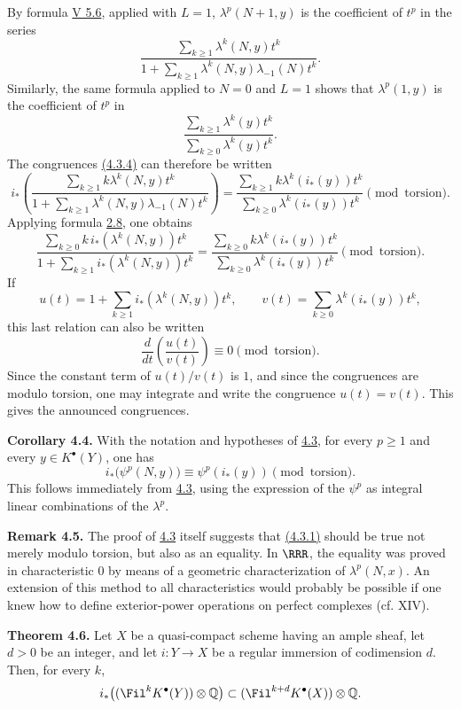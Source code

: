 By formula \hyperlink{sga6.e05.para.5-6}{V 5.6}, applied with \(L=1\), \(\lambda^p(N+1,y)\) is the coefficient of \(t^p\) in the series
\[
  \frac{\sum_{k\ge1}\lambda^k(N,y)t^k}
       {1+\sum_{k\ge1}\lambda^k(N,y)\lambda_{-1}(N)t^k}.
\]
Similarly, the same formula applied to \(N=0\) and \(L=1\) shows that \(\lambda^p(1,y)\) is the coefficient of \(t^p\) in
\[
  \frac{\sum_{k\ge1}\lambda^k(y)t^k}
       {\sum_{k\ge0}\lambda^k(y)t^k}.
\]
The congruences \hyperlink{sga6.e07.eq.4-3-4}{(4.3.4)} can therefore be written
\[
i_*\left(
  \frac{\sum_{k\ge1}k\lambda^k(N,y)t^k}
       {1+\sum_{k\ge1}\lambda^k(N,y)\lambda_{-1}(N)t^k}
\right)
=
  \frac{\sum_{k\ge1}k\lambda^k(i_*(y))t^k}
       {\sum_{k\ge0}\lambda^k(i_*(y))t^k}
       \pmod{\text{torsion}}.
\]
Applying formula \hyperlink{sga6.e07.cor.2-8}{2.8}, one obtains
\[
  \frac{\sum_{k\ge0}k\,i_*(\lambda^k(N,y))t^k}
       {1+\sum_{k\ge1} i_*(\lambda^k(N,y))t^k}
  =
  \frac{\sum_{k\ge0}k\lambda^k(i_*(y))t^k}
       {\sum_{k\ge0}\lambda^k(i_*(y))t^k}
       \pmod{\text{torsion}}.
\]
If
\[
  u(t)=1+\sum_{k\ge1}i_*(\lambda^k(N,y))t^k,\qquad
  v(t)=\sum_{k\ge0}\lambda^k(i_*(y))t^k,
\]
this last relation can also be written
\[
  \frac{d}{dt}\!\left(\frac{u(t)}{v(t)}\right)\equiv0
  \pmod{\text{torsion}}.
\]
Since the constant term of \(u(t)/v(t)\) is \(1\), and since the congruences are modulo torsion, one may integrate and write the congruence \(u(t)=v(t)\). This gives the announced congruences.

\textbf{Corollary 4.4.} With the notation and hypotheses of \hyperlink{sga6.e07.thm.4-3}{4.3}, for every \(p\ge1\) and every \(y\in K^\bullet(Y)\), one has
\[
  i_*\bigl(\psi^p(N,y)\bigr)\equiv \psi^p(i_*(y))
  \pmod{\text{torsion}}.
\]
This follows immediately from \hyperlink{sga6.e07.thm.4-3}{4.3}, using the expression of the \(\psi^p\) as integral linear combinations of the \(\lambda^p\).

\textbf{Remark 4.5.} The proof of \hyperlink{sga6.e07.thm.4-3}{4.3} itself suggests that \hyperlink{sga6.e07.eq.4-3-1}{(4.3.1)} should be true not merely modulo torsion, but also as an equality. In \(\RRR\), the equality was proved in characteristic \(0\) by means of a geometric characterization of \(\lambda^p(N,x)\). An extension of this method to all characteristics would probably be possible if one knew how to define exterior-power operations on perfect complexes (cf. XIV).

\textbf{Theorem 4.6.} Let \(X\) be a quasi-compact scheme having an ample sheaf, let \(d>0\) be an integer, and let \(i:Y\to X\) be a regular immersion of codimension \(d\). Then, for every \(k\),
\[
 i_*\bigl((\Fil^kK^\bullet(Y))\otimes\mathbb Q\bigr)
 \subset
 (\Fil^{k+d}K^\bullet(X))\otimes\mathbb Q.
\]

